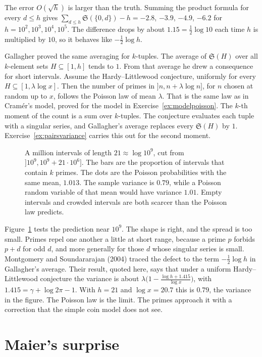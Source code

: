 The error $O(\sqrt h)$ is larger than the truth. Summing the product formula for every $d\le h$ gives $\sum_{d\le h}\mathfrak S(\{0,d\})-h=-2.8$, $-3.9$, $-4.9$, $-6.2$ for $h=10^2,10^3,10^4,10^5$. The difference drops by about $1.15=\frac12\log10$ each time $h$ is multiplied by $10$, so it behaves like $-\frac12\log h$.

Gallagher proved the same averaging for $k$-tuples. The average of $\mathfrak S(H)$ over all $k$-element sets $H\subseteq[1,h]$ tends to $1$. From that average he drew a consequence for short intervals. Assume the Hardy--Littlewood conjecture, uniformly for every $H\subseteq[1,\lambda\log x]$. Then the number of primes in $]n,n+\lambda\log n]$, for $n$ chosen at random up to $x$, follows the Poisson law of mean $\lambda$. That is the same law as in Cramér's model, proved for the model in Exercise~\ref{ex:modelpoisson}. The $k$-th moment of the count is a sum over $k$-tuples. The conjecture evaluates each tuple with a singular series, and Gallagher's average replaces every $\mathfrak S(H)$ by $1$. Exercise~\ref{ex:pairsvariance} carries this out for the second moment.

\begin{figure}[ht]
\centering
{}
\caption{A million intervals of length $21\approx\log10^9$, cut from $]10^9,10^9+21\cdot10^6]$. The bars are the proportion of intervals that contain $k$ primes. The dots are the Poisson probabilities with the same mean, $1.013$. The sample variance is $0.79$, while a Poisson random variable of that mean would have variance $1.01$. Empty intervals and crowded intervals are both scarcer than the Poisson law predicts.}
\label{fig:poisson}
\end{figure}

Figure~\ref{fig:poisson} tests the prediction near $10^9$. The shape is right, and the spread is too small. Primes repel one another a little at short range, because a prime $p$ forbids $p+d$ for odd $d$, and more generally for those $d$ whose singular series is small. Montgomery and Soundararajan (2004) traced the defect to the term $-\frac12\log h$ in Gallagher's average. Their result, quoted here, says that under a uniform Hardy--Littlewood conjecture the variance is about $\lambda\bigl(1-\frac{\log h+1.415}{\log x}\bigr)$, with $1.415=\gamma+\log2\pi-1$. With $h=21$ and $\log x=20.7$ this is $0.79$, the variance in the figure. The Poisson law is the limit. The primes approach it with a correction that the simple coin model does not see.

\section{Maier's surprise}

